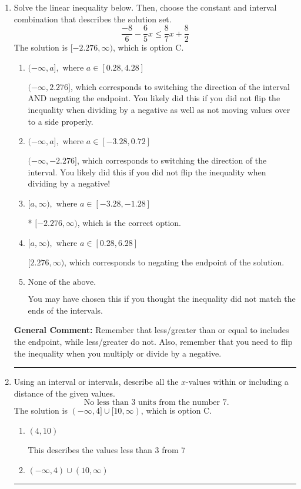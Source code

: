 \documentclass{extbook}[14pt]
\newcommand{\litem}[1]{\item #1

\rule{\textwidth}{0.4pt}}
\begin{document}
\begin{enumerate}\litem{
Solve the linear inequality below. Then, choose the constant and interval combination that describes the solution set.
\[ \frac{-8}{6} - \frac{6}{5} x \leq \frac{8}{7} x + \frac{8}{2} \]The solution is \( [-2.276, \infty) \), which is option C.\begin{enumerate}[label=\Alph*.]
\item \( (-\infty, a], \text{ where } a \in [0.28, 4.28] \)

 $(-\infty, 2.276]$, which corresponds to switching the direction of the interval AND negating the endpoint. You likely did this if you did not flip the inequality when dividing by a negative as well as not moving values over to a side properly.
\item \( (-\infty, a], \text{ where } a \in [-3.28, 0.72] \)

 $(-\infty, -2.276]$, which corresponds to switching the direction of the interval. You likely did this if you did not flip the inequality when dividing by a negative!
\item \( [a, \infty), \text{ where } a \in [-3.28, -1.28] \)

* $[-2.276, \infty)$, which is the correct option.
\item \( [a, \infty), \text{ where } a \in [0.28, 6.28] \)

 $[2.276, \infty)$, which corresponds to negating the endpoint of the solution.
\item \( \text{None of the above}. \)

You may have chosen this if you thought the inequality did not match the ends of the intervals.
\end{enumerate}

\textbf{General Comment:} Remember that less/greater than or equal to includes the endpoint, while less/greater do not. Also, remember that you need to flip the inequality when you multiply or divide by a negative.
}
\litem{
Using an interval or intervals, describe all the $x$-values within or including a distance of the given values.
\[ \text{ No less than } 3 \text{ units from the number } 7. \]The solution is \( (-\infty, 4] \cup [10, \infty) \), which is option C.\begin{enumerate}[label=\Alph*.]
\item \( (4, 10) \)

This describes the values less than 3 from 7
\item \( (-\infty, 4) \cup (10, \infty) \)


\end{enumerate}}
\end{enumerate}
\end{document}
